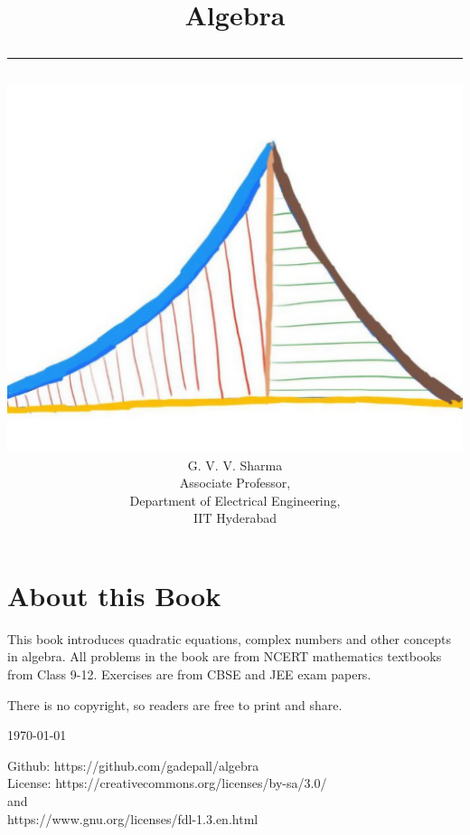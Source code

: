 \documentclass[journal]{IEEEtran}
\begin{document}

\onecolumn


\title{
	\begin{center}
	Algebra
	\\
\rule{0.4\columnwidth}{0.4pt}
\end{center}
}
\author{
\vspace{11cm}
	\begin{center}
\includegraphics[width=0.2\columnwidth]{figs/logo.jpg}
\\
		{\huge	G. V. V. Sharma}\\Associate Professor,\\Department of Electrical Engineering, \\ IIT Hyderabad
	\end{center}
}
\maketitle

\newpage
\section*{About this Book}

This book introduces quadratic equations, complex numbers and other concepts in algebra.   
 All problems in the book are from NCERT mathematics textbooks from Class 9-12.  Exercises are from CBSE and JEE exam papers.   

There is no copyright, so readers are free to print and share.  

\begin{flushright}
\today
\end{flushright}
Github: https://github.com/gadepall/algebra
		\\
License: https://creativecommons.org/licenses/by-sa/3.0/
\\
and
\\
https://www.gnu.org/licenses/fdl-1.3.en.html
\end{document}
